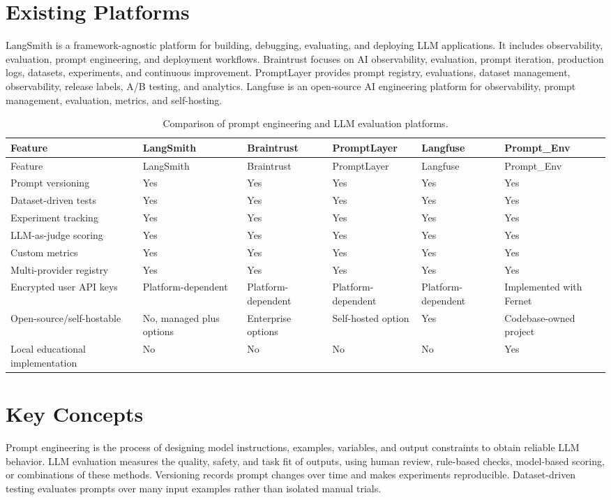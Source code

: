 \documentclass[12pt,a4paper]{report}
\newcommand{\ProjectName}{Prompt\_Env}
\begin{document}
\section{Existing Platforms}
LangSmith is a framework-agnostic platform for building, debugging, evaluating, and deploying LLM applications. It includes observability, evaluation, prompt engineering, and deployment workflows. Braintrust focuses on AI observability, evaluation, prompt iteration, production logs, datasets, experiments, and continuous improvement. PromptLayer provides prompt registry, evaluations, dataset management, observability, release labels, A/B testing, and analytics. Langfuse is an open-source AI engineering platform for observability, prompt management, evaluation, metrics, and self-hosting.

\begin{longtable}{p{}p{}p{}p{}p{}p{}}
\caption{Comparison of prompt engineering and LLM evaluation platforms.}\\
\toprule
Feature & LangSmith & Braintrust & PromptLayer & Langfuse & \ProjectName{} \\
\midrule
\endfirsthead
\toprule
Feature & LangSmith & Braintrust & PromptLayer & Langfuse & \ProjectName{} \\
\midrule
\endhead
Prompt versioning & Yes & Yes & Yes & Yes & Yes \\
Dataset-driven tests & Yes & Yes & Yes & Yes & Yes \\
Experiment tracking & Yes & Yes & Yes & Yes & Yes \\
LLM-as-judge scoring & Yes & Yes & Yes & Yes & Yes \\
Custom metrics & Yes & Yes & Yes & Yes & Yes \\
Multi-provider registry & Yes & Yes & Yes & Yes & Yes \\
Encrypted user API keys & Platform-dependent & Platform-dependent & Platform-dependent & Platform-dependent & Implemented with Fernet \\
Open-source/self-hostable & No, managed plus options & Enterprise options & Self-hosted option & Yes & Codebase-owned project \\
Local educational implementation & No & No & No & No & Yes \\
\bottomrule
\end{longtable}

\section{Key Concepts}
Prompt engineering is the process of designing model instructions, examples, variables, and output constraints to obtain reliable LLM behavior. LLM evaluation measures the quality, safety, and task fit of outputs, using human review, rule-based checks, model-based scoring, or combinations of these methods. Versioning records prompt changes over time and makes experiments reproducible. Dataset-driven testing evaluates prompts over many input examples rather than isolated manual trials.
\end{document}
